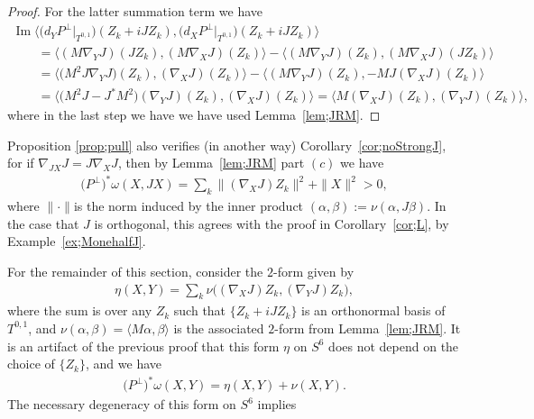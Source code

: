 \documentclass[pdftex]{sigma}
\numberwithin{equation}{section}
\begin{document}
\begin{proof}
For the latter summation term we have
\begin{gather*}
\operatorname{Im} \big\langle \big( d_Y P^\perp\big|_{T^{0,1}} \big) (Z_k + i J Z_k), \big( d_X P^\perp\big|_{T^{0,1}} \big) (Z_k + i J Z_k) \big\rangle\\
\qquad{} =\langle ( M \nabla_Y J ) (J Z_k), ( M \nabla_X J ) (Z_k ) \rangle
-\langle ( M \nabla_Y J ) (Z_k ), ( M \nabla_X J ) ( J Z_k) \rangle \\
\qquad{} =\big\langle \big( M^2J \nabla_Y J\big) ( Z_k), (\nabla_X J) (Z_k ) \big\rangle-
\langle ( M \nabla_Y J ) (Z_k ), -MJ (\nabla_X J) ( Z_k) \rangle \\
\qquad{} = \big\langle \big(M^2J-J^*M^2\big) ( \nabla_Y J ) ( Z_k), (\nabla_X J) (Z_k ) \big\rangle
=\langle M (\nabla_X J) ( Z_k), (\nabla_Y J) (Z_k ) \rangle ,
\end{gather*}
where in the last step we have we have used Lemma~\ref{lem;JRM}.
\end{proof}

\begin{rmk}Proposition \ref{prop;pull} also verifies (in another way) Corollary~\ref{cor;noStrongJ}, for if $\nabla_{JX} J = J \nabla_X J$, then by Lemma~\ref{lem;JRM} part $(c)$ we have
\begin{gather*}
\big(P^\perp\big)^*\omega(X,JX) = \sum_k \| (\nabla_X J) Z_k \|^2 + \|X\|^2 >0,
\end{gather*}
where $\|\cdot \|$is the norm induced by the inner product $( \alpha ,\beta ) := \nu (\alpha , J \beta)$. In the case that $J$ is orthogonal, this agrees with the proof in Corollary~\ref{cor;L}, by Example~\ref{ex;MonehalfJ}.
\end{rmk}

For the remainder of this section, consider the $2$-form given by
\begin{gather*}
\eta(X,Y) = \sum_k \nu \big( (\nabla_X J) Z_k, (\nabla_Y J) Z_k \big),
\end{gather*}
where the sum is over any $Z_k$ such that $\{Z_k + i J Z_k\}$ is an orthonormal basis of $T^{0,1}$, and $\nu(\alpha ,\beta) = \langle M \alpha, \beta \rangle$ is the associated $2$-form from Lemma~\ref{lem;JRM}. It is an artifact of the previous proof that this form $\eta$ on $S^6$ does not depend on the choice of $\{Z_k\}$, and we have
\begin{gather*}
\big(P^\perp\big)^*\omega(X,Y) =\eta(X,Y) + \nu ( X , Y ).
\end{gather*}
The necessary degeneracy of this form on $S^6$ implies
\end{document}
